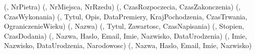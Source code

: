 \begin{encje}
    \encja[SALA](, NrPietra)
    \encja[MIEJSCE](, NrMiejsca, NrRzedu)
    \encja[SPEKTAKL](, CzasRozpoczecia, CzasZakonczenia)
    \encja[REZERWACJA](, CzasWykonania)
    \encja[FILM](, Tytul, Opis, DataPremiery, KrajPochodzenia, CzasTrwania, OgraniczenieWieku)
    \encja[GATUNEK](, Nazwa)
    \encja[KOMENTARZ](, Tytul, Zawartosc, CzasNapisania)
    \encja[OCENA](, Stopien, CzasDodania)
    \encja[KLIENT](, Nazwa, Haslo, Email, Imie, Nazwisko, DataUrodzenia)
    \encja[FILMOWIEC](, Imie, Nazwisko, DataUrodzenia, Narodowosc)
    \encja[KASJER](, Nazwa, Haslo, Email, Imie, Nazwisko)
\end{encje}

\begin{zwiazki}
    
\end{zwiazki}

